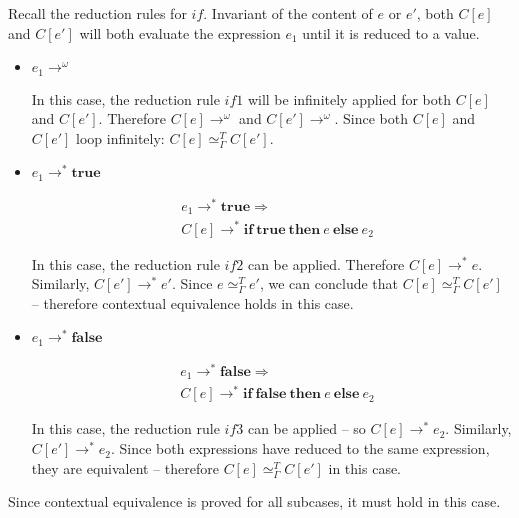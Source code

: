 \documentclass[10pt,\jkfside,a4paper]{article}
\begin{document}
\begin{enumerate}
\begin{itemize}[label=\textbf{case}]
Recall the reduction rules for $if$. Invariant of the content of $e$ or
$e'$, both $C[e]$ and $C[e']$ will both evaluate the expression $e_1$ until
it is reduced to a value.

\begin{itemize}[label=\textbf{case}]

\item $e_1 \to^\omega$

In this case, the reduction rule $if1$ will be infinitely applied for both
$C[e]$ and $C[e']$. Therefore $C[e] \to^\omega$ and $C[e'] \to ^\omega$.
Since both $C[e]$ and $C[e']$ loop infinitely: $C[e] \simeq^T_\Gamma C[e']$.

\item $e_1 \to^* \mathbf{true}$

\begin{align*}
&e_1 \to^* \mathbf{true} \Longrightarrow \\
&C[e] \to^* \mathbf{if\ true\ then\ }e \mathbf{\ else\ }e_2
\end{align*}

In this case, the reduction rule $if2$ can be applied. Therefore $C[e] \to^*
e$. Similarly, $C[e'] \to^* e'$. Since $e \simeq_\Gamma^T e'$, we can
conclude that $C[e] \simeq^T_{\Gamma} C[e']$ -- therefore contextual
equivalence holds in this case.

\item $e_1 \to^* \mathbf{false}$

\begin{align*}
&e_1 \to^* \mathbf{false} \Longrightarrow \\
&C[e] \to^* \mathbf{if\ false\ then\ }e \mathbf{\ else\ }e_2
\end{align*}

In this case, the reduction rule $if3$ can be applied -- so $C[e] \to^* e_2$.
Similarly, $C[e']\to^* e_2$. Since both expressions have reduced to the same
expression, they are equivalent -- therefore $C[e]\simeq^T_\Gamma C[e']$ in
this case.

\end{itemize}

Since contextual equivalence is proved for all subcases, it must hold in
this case.

\end{itemize}

\end{enumerate}
\end{document}

